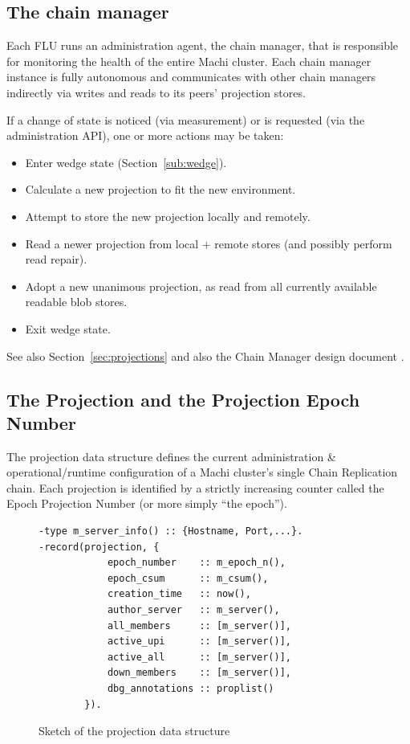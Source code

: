 \documentclass[preprint,10pt]{sigplanconf}
\begin{document}
\subsection{The chain manager}
\label{sub:chain-manager}

Each FLU runs an administration agent, the chain manager, that is
responsible for monitoring the health of the entire Machi cluster.
Each chain manager instance is fully autonomous and communicates with
other chain managers indirectly via writes and reads to its peers'
projection stores.

If a change of state is noticed (via measurement) or is requested (via
the administration API), one or more actions may be taken:

\begin{itemize}
\item Enter wedge state (Section~\ref{sub:wedge}).
\item Calculate a new projection to fit the new environment.
\item Attempt to store the new projection locally and remotely.
\item Read a newer projection from local + remote stores (and possibly
  perform read repair).
\item Adopt a new unanimous projection, as read from all
  currently available readable blob stores.
\item Exit wedge state.
\end{itemize}

See also Section~\ref{sec:projections} and also the Chain Manager
design document \cite{machi-chain-manager-design}.

\subsection{The Projection and the Projection Epoch Number}
\label{sub:projection}

The projection data
structure defines the current administration \& operational/runtime
configuration of a Machi cluster's single Chain Replication chain.
Each projection is identified by a strictly increasing counter called
the Epoch Projection Number (or more simply ``the epoch'').

\begin{figure}
\begin{verbatim}
-type m_server_info() :: {Hostname, Port,...}.
-record(projection, {
            epoch_number    :: m_epoch_n(),
            epoch_csum      :: m_csum(),
            creation_time   :: now(),
            author_server   :: m_server(),
            all_members     :: [m_server()],
            active_upi      :: [m_server()],
            active_all      :: [m_server()],
            down_members    :: [m_server()],
            dbg_annotations :: proplist()
        }).
\end{verbatim}
\caption{Sketch of the projection data structure}
\label{fig:projection}
\end{figure}
\end{document}
